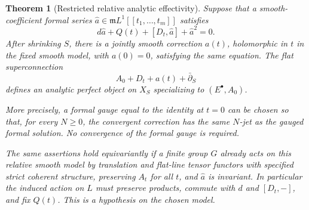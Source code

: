 \documentclass[11pt]{article}
\newtheorem{theorem}{Theorem}[section]
\theoremstyle{definition}
\theoremstyle{remark}
\begin{document}
\begin{theorem}[Restricted relative analytic effectivity]
\label{thm:relative-cohesive-effectivity}
Suppose that a smooth-coefficient formal series
$\widehat a\in\mathfrak m L^1[[t_1,\ldots,t_m]]$ satisfies
\begin{equation}
 d\widehat a+Q(t)+[D_t,\widehat a]+\widehat a^2=0.
 \label{eq:relative-cohesive-formal}
\end{equation}
After shrinking $S$, there is a jointly smooth correction $a(t)$,
holomorphic in $t$ in the fixed smooth model, with $a(0)=0$, satisfying
the same equation.  The flat superconnection
\[
 A_0+D_t+a(t)+\bar\partial_S
\]
defines an analytic perfect object on $X_S$ specializing to
$(E^\bullet,A_0)$.

More precisely, a formal gauge equal to the identity at $t=0$ can be
chosen so that, for every $N\geq0$, the convergent correction has the
same $N$-jet as the gauged formal solution.  No convergence of the
formal gauge is required.

The same assertions hold equivariantly if a finite group $G$ already
acts on this relative smooth model by translation and flat-line tensor
functors with specified strict coherent structure, preserving $A_t$
for all $t$, and $\widehat a$ is invariant.  In particular the induced
action on $L$ must preserve products, commute with $d$ and $[D_t,-]$,
and fix $Q(t)$.  This is a hypothesis on the chosen model.
\end{theorem}
\end{document}
